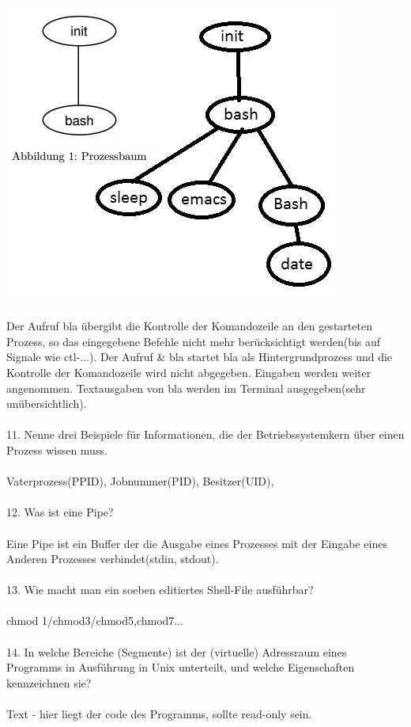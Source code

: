 \documentclass{article}
\begin{document}
\includegraphics{Ti1.jpeg}
\\
\\
Der Aufruf bla \"ubergibt die Kontrolle der Komandozeile an den gestarteten Prozess, so das eingegebene Befehle nicht mehr ber\"ucksichtigt werden(bis auf Signale wie ctl-...). Der Aufruf & bla startet bla als Hintergrundprozess und die Kontrolle der Komandozeile wird nicht abgegeben. Eingaben werden weiter angenommen. Textausgaben von bla werden im Terminal ausgegeben(sehr un\"ubersichtlich). 
\\
\\
11. Nenne drei Beispiele für Informationen, die der Betriebssystemkern über einen Prozess
wissen muss.
\\
\\
Vaterprozess(PPID), Jobnummer(PID), Besitzer(UID),
\\
\\
12. Was ist eine Pipe?
\\
\\
Eine Pipe ist ein Buffer der die Ausgabe eines Prozesses mit der Eingabe eines Anderen Prozesses verbindet(stdin, stdout).
\\
\\
13. Wie macht man ein soeben editiertes Shell-File ausführbar?
\\
\\
chmod 1/chmod3/chmod5,chmod7...
\\
\\
14. In welche Bereiche (Segmente) ist der (virtuelle) Adressraum eines Programms in Ausführung in Unix unterteilt, und welche Eigenschaften kennzeichnen sie?
\\
\\
Text - hier liegt der code des Programms, sollte read-only sein.
\end{document}
